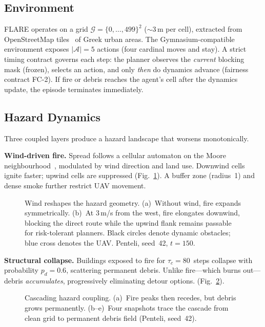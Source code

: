 \documentclass[conference]{IEEEtran}
\begin{document}
\subsection{Environment}

FLARE operates on a grid $\mathcal{G} = \{0,\dots,499\}^2$ (${\sim}3$\,m
per cell), extracted from OpenStreetMap tiles~\cite{Boeing2017} of Greek
urban areas. The Gymnasium-compatible~\cite{Towers2025} environment exposes
$|\mathcal{A}|{=}5$ actions (four cardinal moves and stay). A strict timing
contract governs each step: the planner observes the \emph{current}
blocking mask (frozen), selects an action, and only \emph{then} do dynamics
advance (fairness contract FC-2). If fire or debris reaches the agent's
cell after the dynamics update, the episode terminates immediately.

\subsection{Hazard Dynamics}\label{sec:dynamics}

Three coupled layers produce a hazard landscape that worsens monotonically.

\textbf{Wind-driven fire.} Spread follows a cellular automaton on the Moore
neighbourhood~\cite{Alexandridis2008}, modulated by wind direction and land
use. Downwind cells ignite faster; upwind cells are suppressed
(Fig.~\ref{fig:wind}). A buffer zone (radius~1) and dense smoke further restrict UAV movement.

\begin{figure}[!t]
  \centering
  \caption{Wind reshapes the hazard geometry. (a)~Without wind, fire expands
    symmetrically. (b)~At 3\,m/s from the west, fire elongates downwind,
    blocking the direct route while the upwind flank remains passable for
    risk-tolerant planners. Black circles denote dynamic obstacles; blue
    cross denotes the UAV\@. Penteli, seed~42, $t{=}150$.}
  \label{fig:wind}
\end{figure}

\textbf{Structural collapse.} Buildings exposed to fire for
$\tau_c{=}80$~steps collapse with probability $p_d{=}0.6$, scattering
permanent debris. Unlike fire---which burns out---debris
\emph{accumulates}, progressively eliminating detour options.
(Fig.~\ref{fig:collapse}).

\begin{figure}[t]
  \centering
  \caption{Cascading hazard coupling. (a)~Fire peaks then recedes, but
    debris grows permanently. (b--e)~Four snapshots trace the cascade
    from clean grid to permanent debris field (Penteli, seed~42).}
  \label{fig:collapse}
\end{figure}
\end{document}

